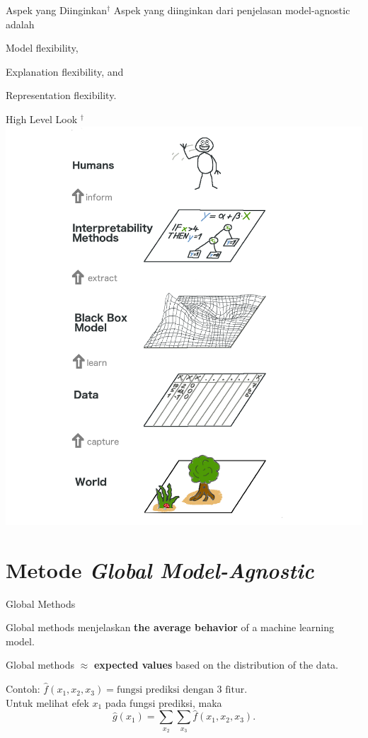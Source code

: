 \documentclass[aspectratio=169]{beamer}
\begin{document}
\begin{frame}{Aspek yang Diinginkan$^\dagger$}
	Aspek yang diinginkan dari penjelasan model-agnostic \citep{ribeiro2016model} adalah
	\begin{vfilleditems}
	\item Model flexibility,
	\item Explanation flexibility, and
	\item Representation flexibility.
\end{vfilleditems}	
\end{frame}

\begin{frame}{High Level Look \citep{molnar2022}$^\dagger$}
	\centering
	\includegraphics[scale=.1375]{images/big-picture}
\end{frame}

\section{Metode \textit{Global Model-Agnostic}}
\begin{frame}{Global Methods}
	\begin{vfilleditems}
		\item<2-> Global methods menjelaskan \textbf{the average behavior} of a machine learning model. 
		\item<3-> Global methods $\approx$ \textbf{expected values} based on the distribution of the data.
		\item<4-> Contoh: $\hat{f}(x_1, x_2, x_3) = \text{fungsi prediksi dengan 3 fitur}$. \\
		Untuk melihat efek $x_1$ pada fungsi prediksi, maka
		\begin{equation*}
			\hat{g}(x_1) = \sum_{x_2}\sum_{x_3}\hat{f}(x_1, x_2, x_3).
		\end{equation*}
	\end{vfilleditems}
\end{frame}
\end{document}
